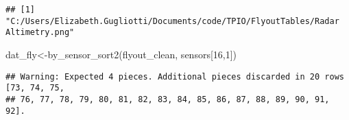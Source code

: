 \documentclass[
]{article}
\newenvironment{Shaded}{\begin{snugshade}}{\end{snugshade}}
\newcommand{\DecValTok}[1]{\textcolor[rgb]{0.00,0.00,0.81}{#1}}
\newcommand{\FunctionTok}[1]{\textcolor[rgb]{0.00,0.00,0.00}{#1}}
\newcommand{\NormalTok}[1]{#1}
\newcommand{\OtherTok}[1]{\textcolor[rgb]{0.56,0.35,0.01}{#1}}
\begin{document}
\begin{verbatim}
## [1] "C:/Users/Elizabeth.Gugliotti/Documents/code/TPIO/FlyoutTables/Radar Altimetry.png"
\end{verbatim}

\begin{Shaded}
\begin{Highlighting}[]
\NormalTok{dat\_fly}\OtherTok{\textless{}{-}}\FunctionTok{by\_sensor\_sort2}\NormalTok{(flyout\_clean, sensors[}\DecValTok{16}\NormalTok{,}\DecValTok{1}\NormalTok{])}
\end{Highlighting}
\end{Shaded}

\begin{verbatim}
## Warning: Expected 4 pieces. Additional pieces discarded in 20 rows [73, 74, 75,
## 76, 77, 78, 79, 80, 81, 82, 83, 84, 85, 86, 87, 88, 89, 90, 91, 92].
\end{verbatim}
\end{document}

